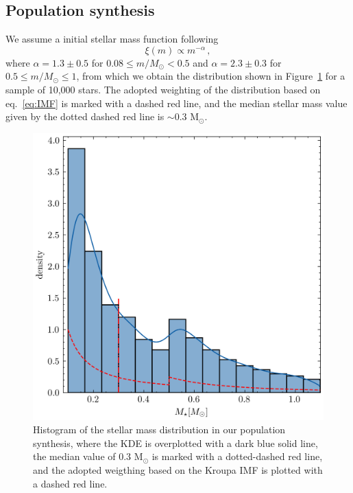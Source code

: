 \documentclass[fleqn,usenatbib,letters]{mnras}
\begin{document}


\subsection{Population synthesis}

We assume a initial stellar mass function following \citet{Kroupa2001}
\begin{equation} \label{eq:IMF}
    \xi(m) \propto m^{-\alpha} \,,
\end{equation}
where $\alpha = 1.3 \pm 0.5$ for $0.08 \leq m/M_\odot < 0.5$ and $\alpha = 2.3 \pm 0.3$ for $0.5 \leq m/M_\odot \leq 1$, from which we obtain the distribution shown in Figure~\ref{fig:stellar_masses} for a sample of 10,000 stars. The adopted weighting of the distribution based on eq.~\ref{eq:IMF} is marked with a dashed red line, and the median stellar mass value given by the dotted dashed red line is $\sim 0.3$ M$_\odot$.
\begin{figure}
    \includegraphics[width=0.95\columnwidth]{Mstar}
    \caption{Histogram of the stellar mass distribution in our population synthesis, where the KDE is overplotted with a dark blue solid line, the median value of $0.3$ M$_\odot$ is marked with a dotted-dashed red line, and the adopted weigthing based on the Kroupa IMF is plotted with a dashed red line. \label{fig:stellar_masses}}
\end{figure}
\end{document}

